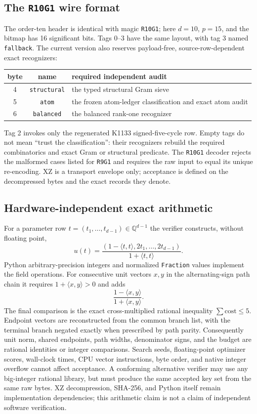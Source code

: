 \documentclass[11pt]{article}
\theoremstyle{definition}
\theoremstyle{remark}
\begin{document}
\subsection{The \texttt{R10G1} wire format}

The order-ten header is identical with magic \texttt{R10G1}; here $d=10$,
$p=15$, and the bitmap has 16 significant bits.  Tags 0--3 have the same
layout, with tag 3 named \texttt{fallback}.  The current version also reserves
payload-free, source-row-dependent exact recognizers:
\begin{center}
\begin{tabular}{ccl}
\toprule
byte&name&required independent audit\\
\midrule
4&\texttt{structural}&the typed structural Gram sieve\\
5&\texttt{atom}&the frozen atom-ledger classification and exact atom audit\\
6&\texttt{balanced}&the balanced rank-one recognizer\\
\bottomrule
\end{tabular}
\end{center}
Tag 2 invokes only the regenerated K1133 signed-five-cycle row.  Empty tags do
not mean ``trust the classification'': their recognizers rebuild the required
combinatorics and exact Gram or structural predicate.  The \texttt{R10G1}
decoder rejects the malformed cases listed for \texttt{R9G1} and requires the
raw input to equal its unique re-encoding.  XZ is a transport envelope only;
acceptance is defined on the decompressed bytes and the exact records they
denote.

\subsection{Hardware-independent exact arithmetic}

For a parameter row $t=(t_1,\ldots,t_{d-1})\in\mathbb Q^{d-1}$ the verifier
constructs, without floating point,
\[
 u(t)=\frac{(1-\langle t,t\rangle,2t_1,\ldots,2t_{d-1})}
             {1+\langle t,t\rangle}.
\]
Python arbitrary-precision integers and normalized \texttt{Fraction} values
implement the field operations.  For consecutive unit vectors $x,y$ in the
alternating-sign path chain it requires $1+\langle x,y\rangle>0$ and adds
\[
             \frac{1-\langle x,y\rangle}{1+\langle x,y\rangle}.
\]
The final comparison is the exact cross-multiplied rational inequality
$\sum\mathrm{cost}\le5$.  Endpoint vectors are reconstructed from the common
branch list, with the terminal branch negated exactly when prescribed by path
parity.  Consequently unit norm, shared endpoints, path widths, denominator
signs, and the budget are rational identities or integer comparisons.  Search
seeds, floating-point optimizer scores, wall-clock times, CPU vector
instructions, byte order, and native integer overflow cannot affect
acceptance.  A conforming alternative verifier may use any big-integer
rational library, but must produce the same accepted key set from the same raw
bytes.  XZ decompression, SHA-256, and Python itself remain implementation
dependencies; this arithmetic claim is not a claim of independent software
verification.
\end{document}
